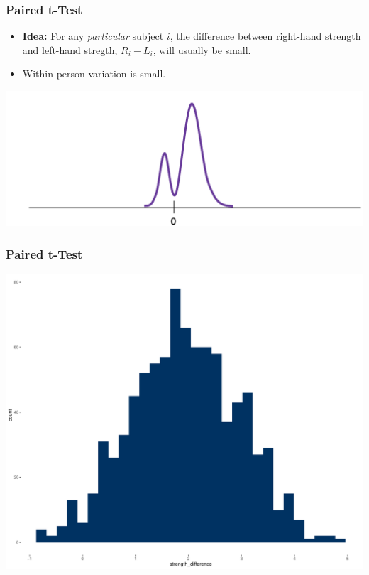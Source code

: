 \documentclass[12pt, block=fill]{beamer}
\begin{document}
\begin{frame}
  \frametitle{Paired t-Test}

  \begin{itemize}
  \item \textbf{Idea:} For any \textit{particular} subject $i$, the difference
    between right-hand strength and left-hand stregth, $R_i - L_i$,
    will usually be small.
  \item Within-person variation is small.
  \end{itemize}

  \begin{center}
    \includegraphics[width=.9\linewidth]{./figures/grip}
  \end{center}
\end{frame}

\begin{frame}
  \frametitle{Paired t-Test}
  \centering
    \includegraphics[width=.9\linewidth]{./figures/histogram_paired.pdf}
\end{frame}
\end{document}
